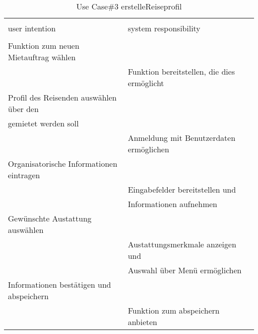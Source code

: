 \begin{table}[H]
\caption{Use Case\#3 erstelleReiseprofil }
\centering
\begin{tabular}{l l}
\\ [-0.5ex]

\hline\hline
\\ [-0.5ex]
user intention & system responsibility
\\ [1.5ex]
\hline
\\ [-0.5ex]
Funktion zum neuen Mietauftrag wählen     &                                   \\[1ex]
                                 & Funktion bereitstellen, die dies ermöglicht   \\[1ex]
Profil des Reisenden auswählen über den      &                                   \\[1ex]
gemietet werden soll                      &                                   \\[1ex]
                                 & Anmeldung mit Benutzerdaten ermöglichen    \\[1ex]
Organisatorische Informationen eintragen  &                                   \\[1ex] 
                                 & Eingabefelder bereitstellen und            \\[1ex]
                                 & Informationen aufnehmen                 \\[1ex]
Gewünschte Austattung auswählen           &                                   \\[1ex]
                                 & Austattungsmerkmale anzeigen und           \\[1ex]
                                 & Auswahl über Menü ermöglichen           \\[1ex]
Informationen bestätigen und abspeichern  &                                   \\[1ex]
                                 & Funktion zum abspeichern anbieten          \\[1ex]

\hline
\end{tabular}
\label{tab:mietauftragUC}
\end{table}

